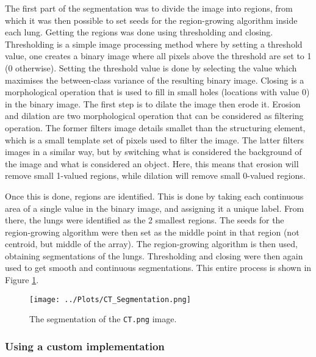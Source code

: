 \documentclass[12pt]{report} %
\begin{document}
The first part of the segmentation was to divide the image into regions, from which it was then possible to set seeds for the region-growing algorithm inside each lung. Getting the regions was done using thresholding and closing. Thresholding is a simple image processing method where by setting a threshold value, one creates a binary image where all pixels above the threshold are set to 1 (0 otherwise)\cite[p.743]{gonzalez2002digital}. Setting the threshold value is done by selecting the value which maximises the between-class variance of the resulting binary image\cite[pp. 747-751]{gonzalez2002digital}. Closing is a morphological operation that is used to fill in small holes (locations with value 0) in the binary image. The first step is to dilate the image then erode it\cite[pp.645-648]{gonzalez2002digital}. Erosion and dilation are two morphological operation that can be considered as filtering operation. The former filters image details smallet than the structuring element, which is a small template set of pixels used to filter the image\cite[pp. 636-638]{gonzalez2002digital}. The latter filters images in a similar way, but by switching what is considered the background of the image and what is considered an object. Here, this means that erosion will remove small 1-valued regions, while dilation will remove small 0-valued regions.

Once this is done, regions are identified. This is done by taking each continuous area of a single value in the binary image, and assigning it a unique label\cite{skimage_measure_label}. From there, the lungs were identified as the 2 smallest regions. The seeds for the region-growing algorithm were then set as the middle point in that region (not centroid, but middle of the array). The region-growing algorithm is then used, obtaining segmentations of the lungs. Thresholding and closing were then again used to get smooth and continuous segmentations. This entire process is shown in Figure \ref{fig:ct_segmentation}.

\begin{figure}[htbp]
    \centering
    \texttt{[image: ../Plots/CT\_Segmentation.png]}
    \caption{The segmentation of the \texttt{CT.png} image.}
    \label{fig:ct_segmentation}
\end{figure}

\subsubsection{Using a custom implementation}
\end{document}
